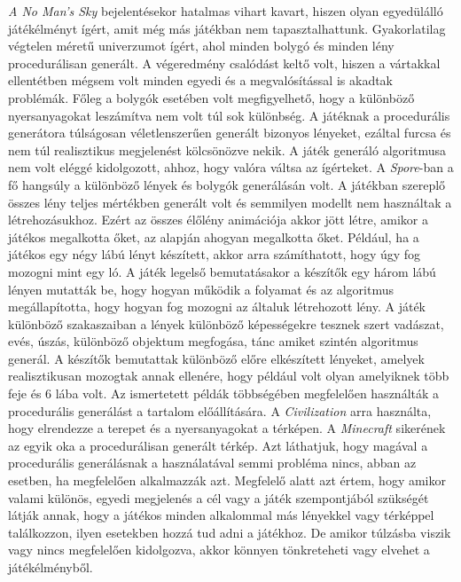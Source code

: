 \newline
\newline \textit{A No Man’s Sky} bejelentésekor hatalmas vihart kavart, hiszen olyan egyedülálló játékélményt ígért, amit még más játékban nem tapasztalhattunk. Gyakorlatilag végtelen méretű univerzumot ígért, ahol minden bolygó és minden lény procedurálisan generált. A végeredmény csalódást keltő volt, hiszen a vártakkal ellentétben mégsem volt minden egyedi és a megvalósítással is akadtak problémák. Főleg a bolygók esetében volt megfigyelhető, hogy a különböző nyersanyagokat leszámítva nem volt túl sok különbség. A játéknak a procedurális generátora túlságosan véletlenszerűen generált bizonyos lényeket, ezáltal furcsa és nem túl realisztikus megjelenést kölcsönözve nekik. A játék generáló algoritmusa nem volt eléggé kidolgozott, ahhoz, hogy valóra váltsa az ígérteket.
\newline
\newline A \textit{Spore}-ban a fő hangsúly a különböző lények és bolygók generálásán volt. A játékban szereplő összes lény teljes mértékben generált volt és semmilyen modellt nem használtak a létrehozásukhoz. Ezért az összes élőlény animációja akkor jött létre, amikor a játékos megalkotta őket, az alapján ahogyan megalkotta őket. Például, ha a játékos egy négy lábú lényt készített, akkor arra számíthatott, hogy úgy fog mozogni mint egy ló. A játék legelső bemutatásakor a készítők egy három lábú lényen mutatták be, hogy hogyan működik a folyamat és az algoritmus megállapította, hogy hogyan fog mozogni az általuk létrehozott lény. A játék különböző szakaszaiban a lények különböző képességekre tesznek szert vadászat, evés, úszás, különböző objektum megfogása, tánc amiket szintén algoritmus generál. A készítők bemutattak különböző előre elkészített lényeket, amelyek realisztikusan mozogtak annak ellenére, hogy például volt olyan amelyiknek több feje és 6 lába volt.
\newline
\newline Az ismertetett példák többségében megfelelően használták a procedurális generálást a tartalom előállítására. A \textit{Civilization} arra használta, hogy elrendezze a terepet és a nyersanyagokat a térképen. A \textit{Minecraft} sikerének az egyik oka a procedurálisan generált térkép. Azt láthatjuk, hogy magával a procedurális generálásnak a használatával semmi probléma nincs, abban az esetben, ha megfelelően alkalmazzák azt. Megfelelő alatt azt értem, hogy amikor valami különös, egyedi megjelenés a cél vagy a játék szempontjából szükségét látják annak, hogy a játékos minden alkalommal más lényekkel vagy térképpel találkozzon, ilyen esetekben hozzá tud adni a játékhoz. De amikor túlzásba viszik vagy nincs megfelelően kidolgozva, akkor könnyen tönkreteheti vagy elvehet a játékélményből. 
